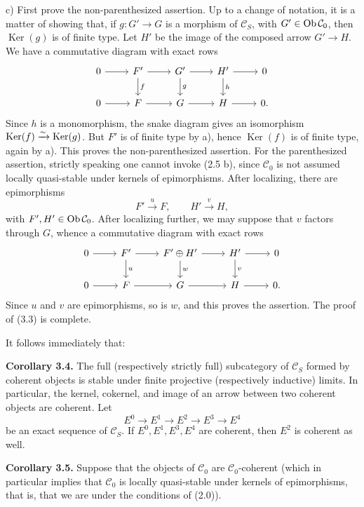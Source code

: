 \documentclass[11pt]{article}
\providecommand{\Ker}{\operatorname{Ker}}
\begin{document}
c) First prove the non-parenthesized assertion. Up to a change of notation, it is a matter of showing that, if \(g:G'\to G\) is a morphism of \(\mathcal C_S\), with \(G'\in\operatorname{Ob}\mathcal C_0\), then \(\Ker(g)\) is of finite type. Let \(H'\) be the image of the composed arrow \(G'\to H\). We have a commutative diagram with exact rows
\[
\begin{tikzcd}
0\arrow[r]&F'\arrow[r]\arrow[d,"f"]&G'\arrow[r]\arrow[d,"g"]&H'\arrow[r]\arrow[d,"h"]&0\\
0\arrow[r]&F\arrow[r]&G\arrow[r]&H\arrow[r]&0 .
\end{tikzcd}
\]
Since \(h\) is a monomorphism, the snake diagram gives an isomorphism \(\Ker(f)\qis\Ker(g)\). But \(F'\) is of finite type by a), hence \(\Ker(f)\) is of finite type, again by a). This proves the non-parenthesized assertion. For the parenthesized assertion, strictly speaking one cannot invoke (2.5 b), since \(\mathcal C_0\) is not assumed locally quasi-stable under kernels of epimorphisms. After localizing, there are epimorphisms
\[
  F'\xrightarrow{u}F,
  \qquad H'\xrightarrow{v}H,
\]
with \(F',H'\in\operatorname{Ob}\mathcal C_0\). After localizing further, we may suppose that \(v\) factors through \(G\), whence a commutative diagram with exact rows
\[
\begin{tikzcd}
0\arrow[r]&F'\arrow[r]\arrow[d,"u"]&F'\oplus H'\arrow[r]\arrow[d,"w"]&H'\arrow[r]\arrow[d,"v"]&0\\
0\arrow[r]&F\arrow[r]&G\arrow[r]&H\arrow[r]&0 .
\end{tikzcd}
\]
Since \(u\) and \(v\) are epimorphisms, so is \(w\), and this proves the assertion. The proof of (3.3) is complete.

It follows immediately that:

\textbf{Corollary 3.4.} The full (respectively strictly full) subcategory of \(\mathcal C_S\) formed by coherent objects is stable under finite projective (respectively inductive) limits. In particular, the kernel, cokernel, and image of an arrow between two coherent objects are coherent. Let
\[
  E^0\longrightarrow E^1\longrightarrow E^2\longrightarrow E^3\longrightarrow E^4
\]
be an exact sequence of \(\mathcal C_S\). If \(E^0,E^1,E^3,E^4\) are coherent, then \(E^2\) is coherent as well.

\textbf{Corollary 3.5.} Suppose that the objects of \(\mathcal C_0\) are \(\mathcal C_0\)-coherent (which in particular implies that \(\mathcal C_0\) is locally quasi-stable under kernels of epimorphisms, that is, that we are under the conditions of (2.0)).
\end{document}
